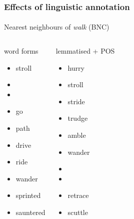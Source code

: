 \documentclass[t]{beamer} %
\begin{document}
\begin{frame}
  \frametitle{Effects of linguistic annotation}
  \framesubtitle{}

  \centering
  Nearest neighbours of \emph{walk} (BNC)
  \footnotesize
  \begin{columns}[t]
    \column{4cm}
    \begin{block}{word forms}
      \begin{itemize}
      \item stroll
      \item {}
      \item {}
      \item go
      \item path
      \item drive
      \item ride
      \item wander
      \item sprinted
      \item sauntered
      \end{itemize}
    \end{block}
    \column{4cm}
    \begin{block}{lemmatised + POS}
      \begin{itemize}
      \item hurry
      \item stroll
      \item stride
      \item trudge
      \item amble
      \item wander
      \item {} 
      \item {}
      \item retrace
      \item scuttle 
      \end{itemize}
    \end{block}
  \end{columns}
\end{frame}
\end{document}
